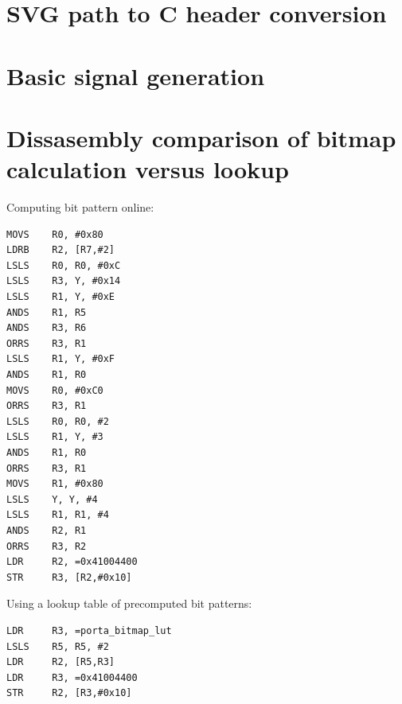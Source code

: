 \documentclass[12pt]{article}
\begin{document}
\newpage
\begin{appendices}
\section{SVG path to C header conversion}
\label{appendix:svg2header}


\newpage
\section{Basic signal generation}
\label{appendix:staticvector}


\newpage
\section{Dissasembly comparison of bitmap calculation versus lookup}
\label{appendix:lutoptimisation}

\begin{multicols}{2}

\noindent Computing bit pattern online:
\begin{lstlisting}
MOVS    R0, #0x80
LDRB    R2, [R7,#2]
LSLS    R0, R0, #0xC
LSLS    R3, Y, #0x14
LSLS    R1, Y, #0xE
ANDS    R1, R5
ANDS    R3, R6
ORRS    R3, R1
LSLS    R1, Y, #0xF
ANDS    R1, R0
MOVS    R0, #0xC0
ORRS    R3, R1
LSLS    R0, R0, #2
LSLS    R1, Y, #3
ANDS    R1, R0
ORRS    R3, R1
MOVS    R1, #0x80
LSLS    Y, Y, #4
LSLS    R1, R1, #4
ANDS    R2, R1
ORRS    R3, R2
LDR     R2, =0x41004400
STR     R3, [R2,#0x10]
\end{lstlisting}

\columnbreak
\noindent Using a lookup table of precomputed bit patterns:

\begin{lstlisting}
LDR     R3, =porta_bitmap_lut
LSLS    R5, R5, #2
LDR     R2, [R5,R3]
LDR     R3, =0x41004400
STR     R2, [R3,#0x10]
\end{lstlisting}

\end{multicols}

\end{appendices}
\end{document}
